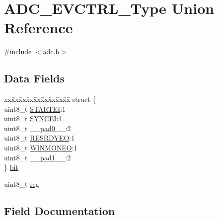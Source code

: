 \hypertarget{union_a_d_c___e_v_c_t_r_l___type}{}\section{A\+D\+C\+\_\+\+E\+V\+C\+T\+R\+L\+\_\+\+Type Union Reference}
\label{union_a_d_c___e_v_c_t_r_l___type}


{\ttfamily \#include $<$adc.\+h$>$}

\subsection*{Data Fields}
\begin{DoxyCompactItemize}
\item 
\begin{tabbing}
xx\=xx\=xx\=xx\=xx\=xx\=xx\=xx\=xx\=\kill
struct \{\\
\>uint8\_t \mbox{\hyperlink{union_a_d_c___e_v_c_t_r_l___type_aa41cf9b362f9377e62cd91c88353fddc}{STARTEI}}:1\\
\>uint8\_t \mbox{\hyperlink{union_a_d_c___e_v_c_t_r_l___type_a3beaa3306c2d6865a2c8db2790422739}{SYNCEI}}:1\\
\>uint8\_t \mbox{\hyperlink{union_a_d_c___e_v_c_t_r_l___type_a8b4eebe79ded0459acec2f4950102ba3}{\_\_pad0\_\_}}:2\\
\>uint8\_t \mbox{\hyperlink{union_a_d_c___e_v_c_t_r_l___type_a84ee5c73c7c3b18328cd390f23b9bb9b}{RESRDYEO}}:1\\
\>uint8\_t \mbox{\hyperlink{union_a_d_c___e_v_c_t_r_l___type_ad1d2e7703ad4ff1e345fe709a372e573}{WINMONEO}}:1\\
\>uint8\_t \mbox{\hyperlink{union_a_d_c___e_v_c_t_r_l___type_a77f12d2e278bd5c07712648ac0df5e08}{\_\_pad1\_\_}}:2\\
\} \mbox{\hyperlink{union_a_d_c___e_v_c_t_r_l___type_a877a5a938afd47de70bf480b2a40e3c0}{bit}}\\

\end{tabbing}\item 
uint8\+\_\+t \mbox{\hyperlink{union_a_d_c___e_v_c_t_r_l___type_a9428adc9af4653a2050e2536b55dec8d}{reg}}
\end{DoxyCompactItemize}


\subsection{Field Documentation}
\mbox{\label{union_a_d_c___e_v_c_t_r_l___type_a8b4eebe79ded0459acec2f4950102ba3}} 
